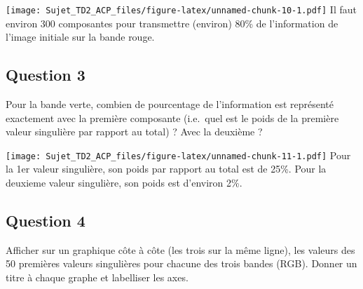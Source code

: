 \documentclass[
]{article}
\newenvironment{Shaded}{\begin{snugshade}}{\end{snugshade}}
\newcommand{\AttributeTok}[1]{\textcolor[rgb]{0.77,0.63,0.00}{#1}}
\newcommand{\DecValTok}[1]{\textcolor[rgb]{0.00,0.00,0.81}{#1}}
\newcommand{\FunctionTok}[1]{\textcolor[rgb]{0.00,0.00,0.00}{#1}}
\newcommand{\NormalTok}[1]{#1}
\newcommand{\SpecialCharTok}[1]{\textcolor[rgb]{0.00,0.00,0.00}{#1}}
\newcommand{\StringTok}[1]{\textcolor[rgb]{0.31,0.60,0.02}{#1}}
\begin{document}
\texttt{[image: Sujet\_TD2\_ACP\_files/figure-latex/unnamed-chunk-10-1.pdf]}
Il faut environ 300 composantes pour transmettre (environ) 80\% de
l'information de l'image initiale sur la bande rouge.

\hypertarget{question-3}{%
\subsection{Question 3}\label{question-3}}

Pour la bande verte, combien de pourcentage de l'information est
représenté exactement avec la première composante (i.e.~quel est le
poids de la première valeur singulière par rapport au total) ? Avec la
deuxième ?

\begin{Shaded}
\end{Shaded}

\texttt{[image: Sujet\_TD2\_ACP\_files/figure-latex/unnamed-chunk-11-1.pdf]}
Pour la 1er valeur singulière, son poids par rapport au total est de
25\%. Pour la deuxieme valeur singulière, son poids est d'environ 2\%.

\hypertarget{question-4}{%
\subsection{Question 4}\label{question-4}}

Afficher sur un graphique côte à côte (les trois sur la même ligne), les
valeurs des 50 premières valeurs singulières pour chacune des trois
bandes (RGB). Donner un titre à chaque graphe et labelliser les axes.
\end{document}
